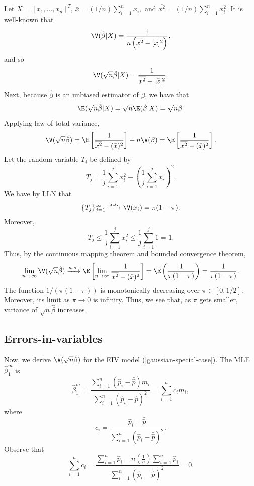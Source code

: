 \documentclass[12pt]{article}
\begin{document}
 Let $X = [x_1, \dots, x_n]^T$, $\bar{x} = (1/n) \sum_{i=1}^n x_i,$ and $\overline{x^2} = (1/n) \sum_{i=1}^n x_i^2.$  It is well-known that
$$ \V(\hat{\beta} | X) = \frac{ 1 }{n \left(\overline{x^2} - [\bar{x}]^2 \right)},$$ and so $$\V( \sqrt{n} \hat{\beta} | X ) = \frac{1}{\overline{x^2} - [\bar{x}]^2}.$$ Next, because $\hat{\beta}$ is an unbiased estimator of $\beta$, we have that
$$ \E( \sqrt{n} \hat{\beta} | X ) = \sqrt{n} \E(\hat{\beta}|X)  = \sqrt{n} \beta.$$ Applying law of total variance,
$$\V(\sqrt{n}\hat{\beta}) = \E\left[ \frac{1}{ \overline{x^2} - (\bar{x})^2} \right] + n \V(\beta) = \E\left[ \frac{1}{ \overline{x^2} - (\bar{x})^2} \right].$$
Let the random variable $T_i$ be defined by
$$T_j = \frac{1}{j}\sum_{i=1}^j x_i^2 - \left(\frac{1}{j} \sum_{i=1}^j x_i \right)^2.$$ We have by LLN that
$$\{ T_j \}_{j=1}^\infty \xrightarrow{a.s.} \V(x_i) = \pi (1-\pi).$$
Moreover, 
$$T_j \leq \frac{1}{j} \sum_{i=1}^j x_i^2 \leq \frac{1}{j} \sum_{i=1}^j 1 = 1.$$
Thus, by the continuous mapping theorem and bounded convergence theorem,
$$\lim_{n \to \infty} \V(\sqrt{n} \hat{\beta}) \xrightarrow{a.s.} \E \left[ \lim_{n \to \infty} \frac{1}{ \overline{x^2} - (\bar{x})^2} \right] = \E \left( \frac{1}{\pi(1-\pi)}\right) = \frac{1}{\pi(1-\pi)}.$$
The function $1/(\pi(1 - \pi))$ is monotonically decreasing over $\pi \in [0,1/2]$. Moreover, its limit as $\pi \to 0$ is infinity. Thus, we see that, as $\pi$ gets smaller, variance of $\sqrt{n} \hat{\beta}$ increases.

\subsection{Errors-in-variables}

Now, we derive $\V(\sqrt{n}\hat{\beta})$ for the EIV model (\ref{gaussian-special-case}). The MLE $\hat{\beta}^m_1$ is
$$ \hat{\beta}^m_1 = \frac{ \sum_{i=1}^n (\hat{p}_i - \bar{\hat{p}}) m_i }{\sum_{i=1}^n (\hat{p}_i - \bar{\hat{p}})^2} = \sum_{i=1}^n c_i m_i,$$ where $$c_i =  \frac{\hat{p}_i - \bar{\hat{p}}}{ \sum_{i=1}^n ( \hat{p}_i - \bar{\hat{p}})^2}.$$ Observe that
$$\sum_{i=1}^n c_i = \frac{\sum_{i=1}^n \hat{p}_i - n \left(\frac{1}{n}\right) \sum_{i=1}^n \hat{p}_i}{ \sum_{i=1}^n (\hat{p}_i - \bar{\hat{p}})^2} = 0.$$
\end{document}
